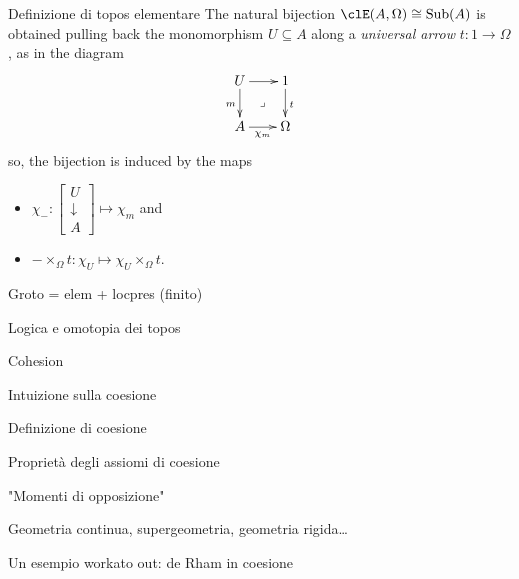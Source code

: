 \documentclass[presentation]{beamer}
\begin{document}
  \begin{frame}{Definizione di topos elementare}
    The natural bijection $\clE(A,\Omega)\cong\text{Sub}(A)$ is obtained pulling back the monomorphism $U\subseteq A$ along a \emph{universal arrow} $t : 1\to \Omega$, as in the diagram
    \[
      \vcenter{\xymatrix@!=3mm{
          U \ar@{}[dr]|\lrcorner \ar[r]\ar[d]_m & 1\ar[d]^t \\
          A \ar[r]_{\chi_m}& \Omega
        }}
    \]
    so, the bijection is induced by the maps 
    \begin{itemize}
      \item $\chi_{-} : \left[\begin{smallmatrix}
        U \\ \downarrow \\ A
      \end{smallmatrix} \right]\mapsto \chi_m$ and 
      \item $-\times_\Omega t : \chi_U \mapsto \chi_U \times_\Omega t$.
    \end{itemize}
    \end{frame}
\begin{frame}[label={sec:orgb2a88e9}]{Groto = elem + locpres (finito)}
\end{frame}
\begin{frame}[label={sec:org0dca741}]{Logica e omotopia dei topos}
\end{frame}



\begin{frame}[label={sec:orgcb4b6ea}]{Cohesion}
\end{frame}
\begin{frame}[label={sec:orga4beb22}]{Intuizione sulla coesione}
\end{frame}
\begin{frame}[label={sec:org16d4ce9}]{Definizione di coesione}
\end{frame}
\begin{frame}[label={sec:org47b3dfb}]{Proprietà degli assiomi di coesione}
\end{frame}
\begin{frame}[label={sec:org2997920}]{"Momenti di opposizione"}
\end{frame}
\begin{frame}[label={sec:orgecc0d62}]{Geometria continua, supergeometria, geometria rigida\ldots{}}
\end{frame}
\begin{frame}[label={sec:orgf9c79a3}]{Un esempio workato out: de Rham in coesione}
\end{frame}
\end{document}
